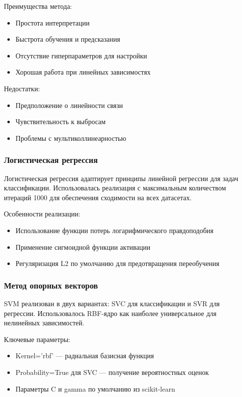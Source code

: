 \documentclass[a4paper]{article}
\begin{document}
Преимущества метода:
\begin{itemize}
    \item Простота интерпретации
    \item Быстрота обучения и предсказания
    \item Отсутствие гиперпараметров для настройки
    \item Хорошая работа при линейных зависимостях
\end{itemize}

Недостатки:
\begin{itemize}
    \item Предположение о линейности связи
    \item Чувствительность к выбросам
    \item Проблемы с мультиколлинеарностью
\end{itemize}

\subsubsection{Логистическая регрессия}
Логистическая регрессия адаптирует принципы линейной регрессии для задач классификации. Использовалась реализация с максимальным количеством итераций 1000 для обеспечения сходимости на всех датасетах.

Особенности реализации:
\begin{itemize}
    \item Использование функции потерь логарифмического правдоподобия
    \item Применение сигмоидной функции активации
    \item Регуляризация L2 по умолчанию для предотвращения переобучения
\end{itemize}

\subsubsection{Метод опорных векторов}
SVM реализован в двух вариантах: SVC для классификации и SVR для регрессии. Использовалось RBF-ядро как наиболее универсальное для нелинейных зависимостей.

Ключевые параметры:
\begin{itemize}
    \item Kernel='rbf' — радиальная базисная функция
    \item Probability=True для SVC — получение вероятностных оценок
    \item Параметры C и gamma по умолчанию из scikit-learn
\end{itemize}
\end{document}
